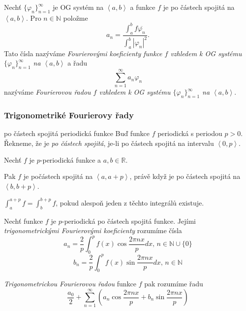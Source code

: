 \begin{definice}
Nechť $\{\varphi_n\}_{n=1}^{\infty}$ je OG systém na $\left<a,b\right>$ a funkce $f$ je po částech spojitá na $\left<a,b\right>$. Pro $n \in \mathbb{N}$ položme
$$a_n = \frac{\int_a^b f\overline{\varphi_n}}{\int_a^b |\varphi_n|^2}.$$
Tato čísla nazýváme \emph{Fourierovými koeficienty funkce $f$ vzhledem k OG systému $\{\varphi_n\}_{n=1}^{\infty}$ na $\left<a,b\right>$} a řadu
$$\sum_{n=1}^{\infty} a_n \varphi_n$$
nazýváme \emph{Fourierovou řadou $f$ vzhledem k OG systému $\{\varphi_n\}_{n=1}^{\infty}$ na $\left<a,b\right>$}.
\end{definice}

\subsubsection{Trigonometriké Fourierovy řady}

\begin{definiceN}{po částech spojitá periodická funkce}
Buď funkce $f$ periodická s periodou $p > 0$. Řekneme, že je \emph{po částech spojitá}, je-li po částech spojitá na intervalu $\left<0,p\right>$.
\end{definiceN}

\begin{poznamka}
Nechť $f$ je $p$-periodická funkce a $a,b \in \mathbb{R}$.
\begin{penumerate}
	\item Pak $f$ je počástech spojitá na $\left<a, a+p\right>$, právě když je po částech spojitá na $\left<b, b+p\right>$.
	\item $\int_a^{a+p}f = \int_b^{b+p}f$, pokud alespoň jeden z těchto integrálů existuje.
\end{penumerate}
\end{poznamka}

\begin{definice}
Nechť funkce $f$ je $p$-periodická po částech spojitá funkce. Jejími \emph{trigonometrickými Fourierovými koeficienty} rozumíme čísla
$$a_n = \frac{2}{p} \int_0^p f(x)\cos \frac{2\pi nx}{p}dx, \, n \in \mathbb{N} \cup \{0\}$$
$$b_n = \frac{2}{p} \int_0^p f(x)\sin \frac{2\pi nx}{p}dx, \, n \in \mathbb{N}$$
\end{definice}

\begin{definice}
\emph{Trigonometrickou Fourierovou řadou} funkce $f$ pak rozumíme řadu
$$\frac{a_0}{2} + \sum_{n=1}^{\infty} \left( a_n \cos \frac{2\pi nx}{p} + b_n \sin \frac{2\pi nx}{p}\right)$$
\end{definice}

